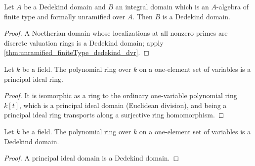 \begin{corollary}
  \label{cor:unramified_finiteType_dedekind}
  \leanok
  Let \(A\) be a Dedekind domain and \(B\) an integral domain which is an \(A\)-algebra of
  finite type and formally unramified over \(A\). Then \(B\) is a Dedekind domain.
\end{corollary}
\begin{proof}
  \leanok
  A Noetherian domain whose localizations at all nonzero primes are discrete valuation
  rings is a Dedekind domain; apply \ref{thm:unramified_finiteType_dedekind_dvr}.
\end{proof}

\begin{lemma}
  \label{lem:mvpoly_fin_one_pid}
  \leanok
  Let \(k\) be a field. The polynomial ring over \(k\) on a one-element set of variables is
  a principal ideal ring.
\end{lemma}
\begin{proof}
  \leanok
  It is isomorphic as a ring to the ordinary one-variable polynomial ring \(k[t]\), which
  is a principal ideal domain (Euclidean division), and being a principal ideal ring
  transports along a surjective ring homomorphism.
\end{proof}

\begin{lemma}
  \label{lem:mvpoly_fin_one_dedekind}
  \leanok
  Let \(k\) be a field. The polynomial ring over \(k\) on a one-element set of variables is
  a Dedekind domain.
\end{lemma}
\begin{proof}
  \leanok
  A principal ideal domain is a Dedekind domain.
\end{proof}

